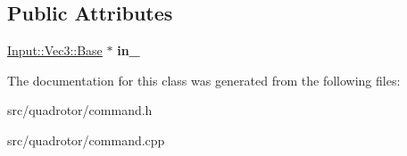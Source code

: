 \subsection*{\-Public \-Attributes}
\begin{DoxyCompactItemize}
\item 
\hypertarget{classCommand_1_1V_a5503b80ffdb2daa746bd1d1c6b6c8ffe}{\hyperlink{classInput_1_1Vec3_1_1Base}{\-Input\-::\-Vec3\-::\-Base} $\ast$ {\bfseries in\-\_\-}}\label{classCommand_1_1V_a5503b80ffdb2daa746bd1d1c6b6c8ffe}

\end{DoxyCompactItemize}


\-The documentation for this class was generated from the following files\-:\begin{DoxyCompactItemize}
\item 
src/quadrotor/command.\-h\item 
src/quadrotor/command.\-cpp\end{DoxyCompactItemize}

